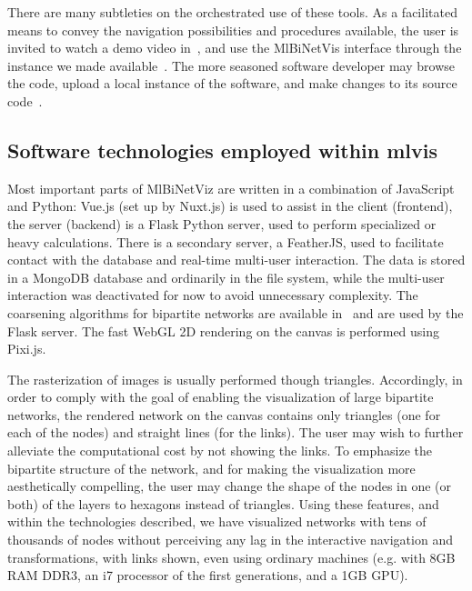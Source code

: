 \documentclass[runningheads]{llncs}
\begin{document}
There are many subtleties on the orchestrated use of these tools.
As a facilitated means to convey the navigation possibilities and
procedures available, the user is invited to watch a demo video in~\cite{yvideo},
and use the MlBiNetVis interface through the instance we made available~\cite{mbnvpage}.
The more seasoned software developer may browse the code, upload a local instance
of the software, and make changes to its source code~\cite{mbnvcode}.

\subsection{Software technologies employed within mlvis}
Most important parts of MlBiNetViz are written in a combination of JavaScript and Python:
Vue.js (set up by Nuxt.js) is used to assist in the client (frontend),
the server (backend) is a Flask Python server, used to perform
specialized or heavy calculations.
There is a secondary server, a FeatherJS, used to facilitate contact with the database
and real-time multi-user interaction.
The data is stored in a MongoDB database and ordinarily in the file system,
while the multi-user interaction was deactivated for now to avoid unnecessary complexity.
The coarsening algorithms for bipartite networks are available in~\cite{bialgs}
and are used by the Flask server.
The fast WebGL 2D rendering on the canvas is performed using Pixi.js.

The rasterization of images is usually performed though triangles.
Accordingly, in order to comply with the goal of enabling the visualization of large bipartite networks,
the rendered network on the canvas contains only triangles (one for each of the nodes) and straight lines (for the links).
The user may wish to further alleviate the computational cost by not showing the links.
To emphasize the bipartite structure of the network, and for making the visualization more aesthetically
compelling, the user may change the shape of the nodes in one (or both) of the layers to hexagons instead of triangles.
Using these features, and within the technologies described, we have visualized networks
with tens of thousands of nodes without perceiving any lag in the interactive navigation and transformations,
with links shown,
even using ordinary machines (e.g. with 8GB RAM DDR3, an i7 processor of the first generations, and a 1GB GPU).
\end{document}
